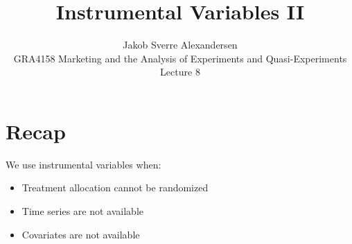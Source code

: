 \documentclass[10pt]{article}
\begin{document}
 
\title{Instrumental Variables II}
\author{Jakob Sverre Alexandersen\\
GRA4158 Marketing and the Analysis of Experiments and Quasi-Experiments\\
Lecture 8}
\maketitle

\tableofcontents
\newpage

\section{Recap}

We use instrumental variables when:
\begin{itemize}
    \item Treatment allocation cannot be randomized 
    \item Time series are not available 
    \item Covariates are not available 
\end{itemize}
\end{document}
